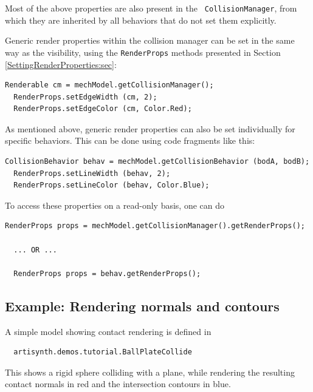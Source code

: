 Most of the above properties are also present in the {\tt
CollisionManager}, from which they are inherited by all behaviors that
do not set them explicitly.

Generic render properties within the collision manager can be
set in the same way as the visibility, using the {\tt RenderProps}
methods presented in Section \ref{SettingRenderProperties:sec}:
\begin{lstlisting}[]
  Renderable cm = mechModel.getCollisionManager();
  RenderProps.setEdgeWidth (cm, 2);
  RenderProps.setEdgeColor (cm, Color.Red);
\end{lstlisting}

As mentioned above, generic render properties can also be set
individually for specific behaviors. This can be done using code
fragments like this:
\begin{lstlisting}[]
  CollisionBehavior behav = mechModel.getCollisionBehavior (bodA, bodB);
  RenderProps.setLineWidth (behav, 2);
  RenderProps.setLineColor (behav, Color.Blue);
\end{lstlisting}
To access these properties on a read-only basis, one can do
\begin{lstlisting}[]
  RenderProps props = mechModel.getCollisionManager().getRenderProps();

  ... OR ...

  RenderProps props = behav.getRenderProps();
\end{lstlisting}

\subsection{Example: Rendering normals and contours}

A simple model showing contact rendering is defined in
%
\begin{verbatim}
  artisynth.demos.tutorial.BallPlateCollide
\end{verbatim}
%
This shows a rigid sphere colliding with a plane, while
rendering the resulting contact normals in red and the
intersection contours in blue. 


